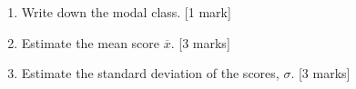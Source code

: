 \documentclass[12pt, twoside]{article}
\begin{document}
\begin{enumerate}
\begin{enumerate}
  \item Write down the modal class.  \hfill [1 mark]  \vspace{2cm}
  \item Estimate the mean score $\overline{x}$. \hfill [3 marks] \vspace{2cm}
  \item Estimate the standard deviation of the scores, $\sigma$.  \hfill [3 marks] \vspace{1cm}
\end{enumerate}



\end{enumerate}
\end{document}
